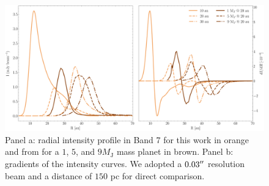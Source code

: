 \documentclass[fleqn,usenatbib]{mnras}
\begin{document}
    \begin{figure}
        \centering
        \includegraphics[width=\textwidth]{Fig6}
        \caption{Panel a: radial intensity profile in Band 7 for this work in orange and from \citet{Ovelar2016,Facchini2018} for a $1$, $5$, and $9 M_\mathrm{J}$ mass planet in brown. Panel b: gradients of the intensity curves. We adopted a $0.03 \hbox{$^{\prime\prime}$}$ resolution beam and a distance of $150$ pc for direct comparison.}
        \label{fig:Grad}
    \end{figure}
    
\end{document}

